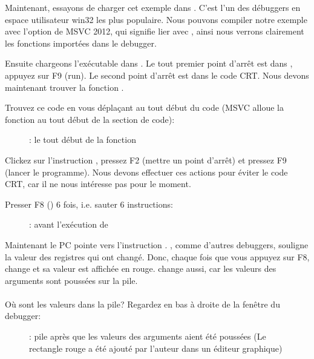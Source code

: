 \clearpage
{}
\myindex{\olly}

Maintenant, essayons de charger cet exemple dans \olly.
C'est l'un des débuggers en espace utilisateur win32 les plus populaire.
Nous pouvons compiler notre exemple avec l'option  de MSVC 2012, qui signifie
lier avec , ainsi nous verrons clairement les fonctions importées
dans le debugger.

Ensuite chargeons l'exécutable dans \olly.
Le tout premier point d'arrêt est dans , appuyez
sur F9 (run).
Le second point d'arrêt est dans le code \ac{CRT}.
Nous devons maintenant trouver la fonction \main.

Trouvez ce code en vous déplaçant au tout début du code (MSVC alloue la fonction
\main au tout début de la section de code):
\begin{figure}[H]
\centering
{}
\caption{\olly: le tout début de la fonction \main}
\label{fig:printf3_olly_1}
\end{figure}

Clickez sur l'instruction , pressez F2 (mettre un point d'arrêt)
et pressez F9 (lancer le programme).
Nous devons effectuer ces actions pour éviter le code \ac{CRT}, car il ne nous intéresse
pas pour le moment.

\clearpage
Presser F8 (\stepover) 6 fois, i.e. sauter 6 instructions:

\begin{figure}[H]
\centering
{}
\caption{\olly: avant l'exécution de \printf}
\label{fig:printf3_olly_2}
\end{figure}

Maintenant le \ac{PC} pointe vers l'instruction .
\olly, comme d'autres debuggers, souligne la valeur des registres qui ont changé.
Donc, chaque fois que vous appuyez sur F8, \EIP change et sa valeur est affichée en rouge.
\ESP change aussi, car les valeurs des arguments sont poussées sur la pile.\\
\\
Où sont les valeurs dans la pile?
Regardez en bas à droite de la fenêtre du debugger:

\begin{figure}[H]
\centering

\caption{\olly: pile après que les valeurs des arguments aient été poussées (Le
rectangle rouge a été ajouté par l'auteur dans un éditeur graphique)}
\end{figure}

